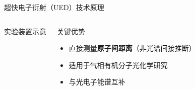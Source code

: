 \documentclass[aspectratio=169,9pt]{beamer}
\begin{document}
\begin{frame}{超快电子衍射（UED）技术原理}
\begin{columns}[T]
\begin{block}{实验装置示意}
    \end{block}

    \begin{exampleblock}{关键优势}
      \scriptsize
      \begin{itemize}
        \item 直接测量\textbf{原子间距离}（非光谱间接推断）
        \item 适用于气相有机分子光化学研究
        \item 与光电子能谱互补
      \end{itemize}
    \end{exampleblock}
  \end{columns}
\end{frame}
\end{document}
